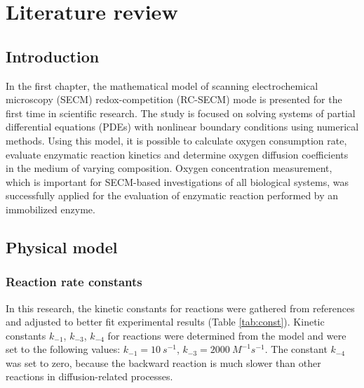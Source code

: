 \chapter{Literature review}
\label{cha:review}

\section{Introduction}

In the first chapter, the mathematical model of scanning electrochemical microscopy (SECM) redox-competition (RC-SECM) mode is presented for the first time in scientific research. The study is focused on solving systems of partial differential equations (PDEs) with nonlinear boundary conditions using numerical methods. Using this model, it is possible to calculate oxygen consumption rate, evaluate enzymatic reaction kinetics and determine oxygen diffusion coefficients in the medium of varying composition. Oxygen concentration measurement, which is important for SECM-based investigations of all biological systems, was successfully applied for the evaluation of enzymatic reaction performed by an immobilized enzyme. 

\section{Physical model} \label{sec:reakc_phys}

\subsection*{Reaction rate constants}  \label{subs:reakc_const}

In this research, the kinetic constants for reactions were gathered from references  and adjusted to better fit experimental results (Table \ref{tab:const}). Kinetic constants $k_{-1}$, $k_{-3}$, $k_{-4}$ for reactions were determined from the model and were set to the following values: $k_{-1} = \SI{10}{s^{-1}}$, $k_{-3} = \SI{2000}{M^{-1}s^{-1}}$. The constant $k_{-4}$ was set to zero, because the backward reaction is much slower than other reactions in diffusion-related processes. 


